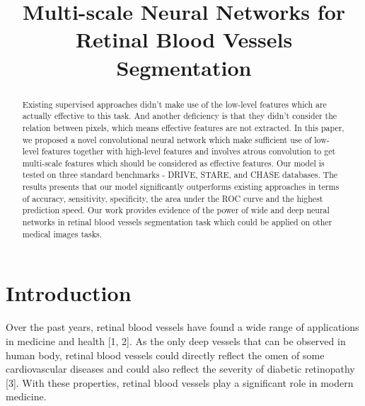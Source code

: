 \documentclass{article}
\title{Multi-scale Neural Networks for Retinal Blood Vessels Segmentation}
\begin{document}

\maketitle

\begin{abstract}
Existing supervised approaches didn't make use of the low-level features which are actually effective to this task. And another deficiency is that they didn't consider the relation between pixels, which means effective features are not extracted. In this paper, we proposed a novel convolutional neural network which make sufficient use of low-level features together with high-level features and involves atrous convolution to get multi-scale features which should be considered as effective features. Our model is tested on three standard benchmarks - DRIVE, STARE, and CHASE databases. The results presents that our model significantly outperforms existing approaches in terms of accuracy, sensitivity, specificity, the area under the ROC curve and the highest prediction speed. Our work provides evidence of the power of wide and deep neural networks in retinal blood vessels segmentation task which could be applied on other medical images tasks.
\end{abstract}

\section{Introduction}

Over the past years, retinal blood vessels have found a wide range of applications in medicine and health [1, 2]. As the only deep vessels that can be observed in human body, retinal blood vessels could directly reflect the omen of some cardiovascular diseases and could also reflect the severity of diabetic retinopathy [3]. With these properties, retinal blood vessels play a significant role in modern medicine. 
\end{document}
